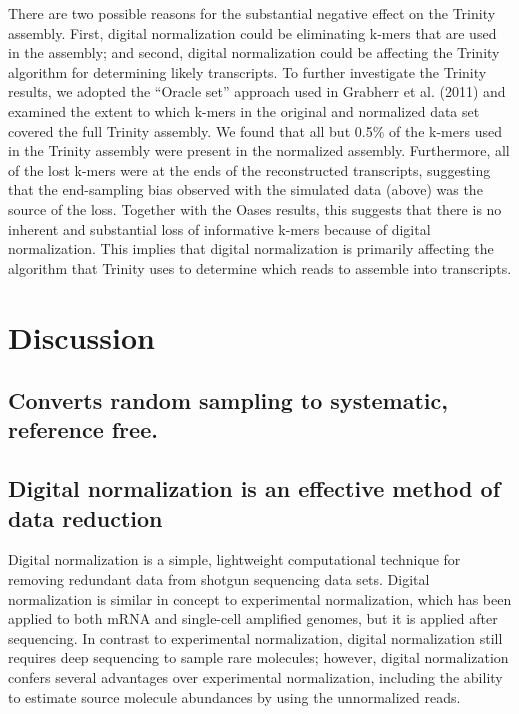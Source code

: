 \documentclass[10pt,draft]{article}
\begin{document}
There are two possible reasons for the substantial negative effect on
the Trinity assembly.  First, digital normalization could be
eliminating k-mers that are used in the assembly; and second, digital
normalization could be affecting the Trinity algorithm for determining
likely transcripts.  To further investigate the Trinity results, we
adopted the ``Oracle set'' approach used in Grabherr et al. (2011) and
examined the extent to which k-mers in the original and normalized
data set covered the full Trinity assembly.  We found that all but
0.5\% of the k-mers used in the Trinity assembly were present in the
normalized assembly.  Furthermore, all of the lost k-mers were at the
ends of the reconstructed transcripts, suggesting that the
end-sampling bias observed with the simulated data (above) was the
source of the loss.  Together with the Oases results, this suggests
that there is no inherent and substantial loss of informative k-mers
because of digital normalization.  This implies that digital
normalization is primarily affecting the algorithm that Trinity uses
to determine which reads to assemble into transcripts.


\section*{Discussion}

\subsection*{Converts random sampling to systematic, reference free.}

\subsection*{Digital normalization is an effective method of data reduction}

Digital normalization is a simple, lightweight computational technique
for removing redundant data from shotgun sequencing data sets.
Digital normalization is similar in concept to experimental
normalization, which has been applied to both mRNA and single-cell
amplified genomes, but it is applied after sequencing.  In contrast to
experimental normalization, digital normalization still requires deep
sequencing to sample rare molecules; however, digital normalization
confers several advantages over experimental normalization, including
the ability to estimate source molecule abundances by using the
unnormalized reads.
\end{document}
